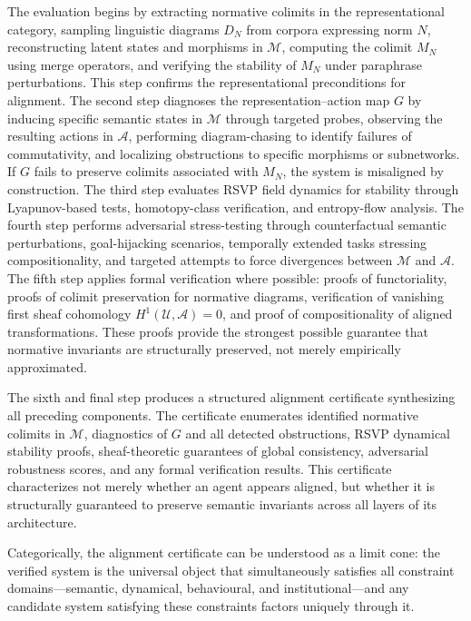 \documentclass[12pt]{article}
\theoremstyle{definition}
\begin{document}
The evaluation begins by extracting normative colimits in the representational
category, sampling linguistic diagrams $D_N$ from corpora expressing norm $N$,
reconstructing latent states and morphisms in $\mathcal{M}$, computing the
colimit $M_N$ using merge operators, and verifying the stability of $M_N$ under
paraphrase perturbations. This step confirms the representational preconditions
for alignment. The second step diagnoses the representation--action map $G$ by
inducing specific semantic states in $\mathcal{M}$ through targeted probes,
observing the resulting actions in $\mathcal{A}$, performing diagram-chasing to
identify failures of commutativity, and localizing obstructions to specific
morphisms or subnetworks. If $G$ fails to preserve colimits associated with
$M_N$, the system is misaligned by construction. The third step evaluates RSVP
field dynamics for stability through Lyapunov-based tests, homotopy-class
verification, and entropy-flow analysis. The fourth step performs adversarial
stress-testing through counterfactual semantic perturbations, goal-hijacking
scenarios, temporally extended tasks stressing compositionality, and targeted
attempts to force divergences between $\mathcal{M}$ and $\mathcal{A}$. The fifth
step applies formal verification where possible: proofs of functoriality, proofs
of colimit preservation for normative diagrams, verification of vanishing first
sheaf cohomology $H^1(\mathcal{U}, \mathcal{A}) = 0$, and proof of
compositionality of aligned transformations. These proofs provide the strongest
possible guarantee that normative invariants are structurally preserved, not
merely empirically approximated.

The sixth and final step produces a structured alignment certificate
synthesizing all preceding components. The certificate enumerates identified
normative colimits in $\mathcal{M}$, diagnostics of $G$ and all detected
obstructions, RSVP dynamical stability proofs, sheaf-theoretic guarantees of
global consistency, adversarial robustness scores, and any formal verification
results. This certificate characterizes not merely whether an agent appears
aligned, but whether it is structurally guaranteed to preserve semantic
invariants across all layers of its architecture.

Categorically, the alignment certificate can be understood as a limit cone: the
verified system is the universal object that simultaneously satisfies all
constraint domains---semantic, dynamical, behavioural, and institutional---and
any candidate system satisfying these constraints factors uniquely through it.
\end{document}
